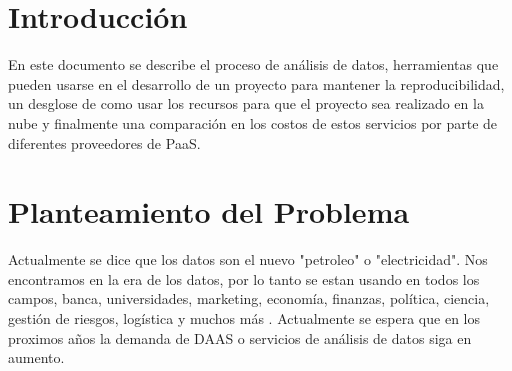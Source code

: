 \documentclass[12pt,a4paper,openright]{article}
\begin{document}

\tableofcontents %


\newpage


\section{Introducci\'on}

En este documento se describe el proceso de análisis de datos, herramientas que pueden usarse en el desarrollo de un proyecto para mantener la reproducibilidad, un desglose de como usar los recursos para que el proyecto sea realizado en la nube y finalmente una comparación en los costos de estos servicios por parte de diferentes proveedores de PaaS.


\section{Planteamiento del Problema}

Actualmente se dice que los datos son el nuevo "petroleo" o "electricidad". Nos encontramos en la era de los datos, por lo tanto se estan usando en todos los campos, banca, universidades, marketing, econom\'ia, finanzas, pol\'itica, ciencia, gesti\'on de riesgos, log\'istica y muchos m\'as . Actualmente se espera que en los proximos años la demanda de DAAS o servicios de an\'alisis de datos siga en aumento.

\end{document}
